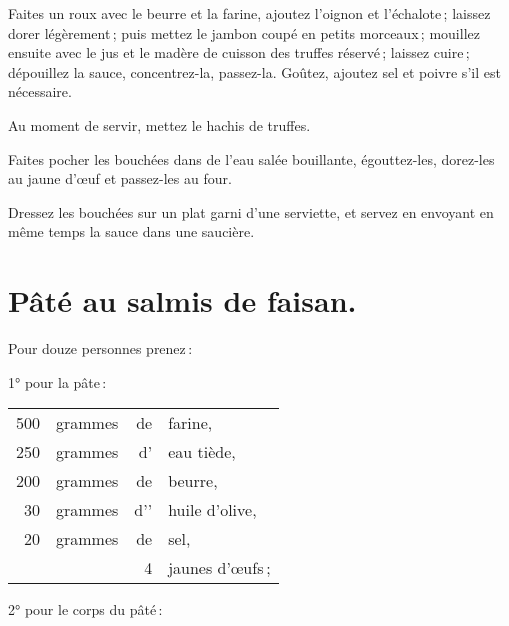 Faites un roux avec le beurre et la farine, ajoutez l'oignon et l'échalote ;
laissez dorer légèrement ; puis mettez le jambon coupé en petits morceaux ;
mouillez ensuite avec le jus et le madère de cuisson des truffes réservé ;
laissez cuire ; dépouillez la sauce, concentrez-la, passez-la. Goûtez, ajoutez
sel et poivre s'il est nécessaire.

Au moment de servir, mettez le hachis de truffes.

Faites pocher les bouchées dans de l’eau salée bouillante, égouttez-les,
dorez-les au jaune d'œuf et passez-les au four.

Dressez les bouchées sur un plat garni d'une serviette, et servez en envoyant
en même temps la sauce dans une saucière.

\section*{\centering Pâté au salmis de faisan.}
{}

Pour douze personnes prenez :

\medskip

1° pour la pâte :

\footnotesize
\begin{longtable}{rrrp{16em}}
    500 & grammes & de & farine,                                                                          \\
    250 & grammes & d' & eau tiède,                                                                       \\
    200 & grammes & de & beurre,                                                                          \\
     30 & grammes & d’'&  huile d'olive,                                                                  \\
     20 & grammes & de & sel,                                                                             \\
        &         &  4 & jaunes d'œufs ;                                                                  \\
\end{longtable}
\normalsize

2° pour le corps du pâté :

